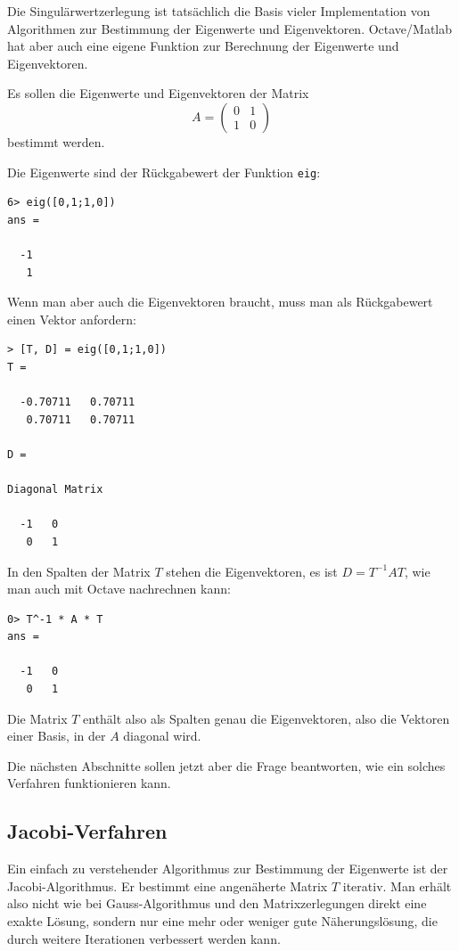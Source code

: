 Die Singulärwertzerlegung ist tatsächlich die Basis vieler Implementation
von Algorithmen zur Bestimmung der Eigenwerte und Eigenvektoren.
Octave/Matlab hat aber auch eine eigene Funktion zur Berechnung der
Eigenwerte und Eigenvektoren.
\begin{beispiel}
Es sollen die Eigenwerte und Eigenvektoren der Matrix
\[
A=\begin{pmatrix}0&1\\1&0\end{pmatrix}
\]
bestimmt werden.

Die Eigenwerte sind der Rückgabewert der Funktion {\tt eig}:
\begin{verbatim}
6> eig([0,1;1,0])
ans =

  -1
   1
\end{verbatim}
Wenn man aber auch die Eigenvektoren braucht, muss man als Rückgabewert
einen Vektor anfordern:
\begin{verbatim}
> [T, D] = eig([0,1;1,0])
T =

  -0.70711   0.70711
   0.70711   0.70711

D =

Diagonal Matrix

  -1   0
   0   1
\end{verbatim}
In den Spalten der Matrix $T$ stehen die Eigenvektoren, es ist
$D=T^{-1}AT$, wie man auch mit Octave nachrechnen kann:
\begin{verbatim}
0> T^-1 * A * T
ans =

  -1   0
   0   1
\end{verbatim}
Die Matrix $T$ enthält also als Spalten genau die Eigenvektoren,
also die Vektoren einer Basis, in der $A$ diagonal wird.
\end{beispiel}
Die nächsten Abschnitte sollen jetzt aber die Frage beantworten,
wie ein solches Verfahren funktionieren kann.

\subsection{Jacobi-Verfahren}
Ein einfach zu verstehender Algorithmus zur Bestimmung der Eigenwerte
ist der Jacobi-Algorithmus.
Er bestimmt eine angenäherte Matrix $T$ iterativ.
Man erhält also nicht wie bei Gauss-Algorithmus und
den Matrixzerlegungen direkt eine exakte Lösung, sondern nur eine
mehr oder weniger gute Näherungslösung, die durch weitere Iterationen
verbessert werden kann.

